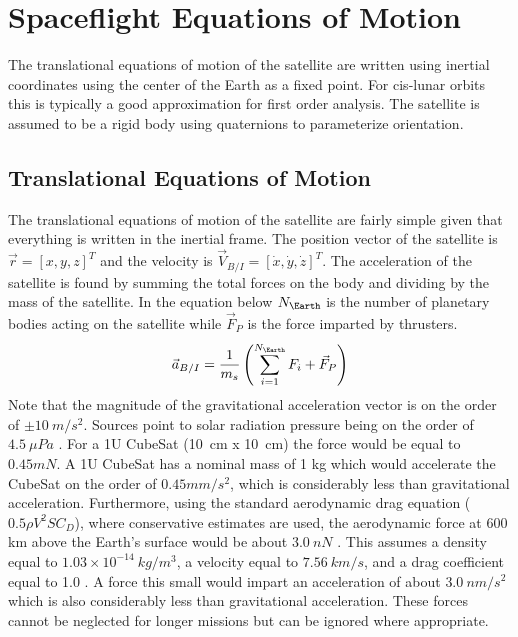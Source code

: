 \documentclass{article}
\begin{document}
\section{Spaceflight Equations of Motion}

The translational equations of motion of
the satellite are written using inertial coordinates using the center
of the Earth as a fixed point. For cis-lunar orbits this is typically
a good approximation for first order analysis. The satellite is
assumed to be a rigid body using quaternions to parameterize
orientation. 

\subsection{Translational Equations of Motion}

The translational equations of motion of the satellite are fairly simple given
that everything is written in the inertial frame. The position vector
of the satellite is $\vec{r} = [x,y,z]^T$ and the velocity is
$\vec{V}_{B/I}=[\dot{x},\dot{y},\dot{z}]^T$. The acceleration of
the satellite is found by summing the total forces on the body
and dividing by the mass of the satellite. In the equation below
$N_\Earth$ is the number of planetary bodies acting on the satellite
while $\vec{F}_P$ is the force imparted by thrusters. 
\begin{equation}
  \vec{a}_{B/I} = \frac{1}{m_s}\left(\sum\limits_{i=1}^{N_\Earth}F_i + \vec{F}_P \right)
\end{equation}
Note that the magnitude of the gravitational acceleration vector is on
the order of $\pm 10~m/s^2$. Sources point to solar radiation pressure
being on the order of $4.5~\mu Pa$ \cite{Radiation}. For a 1U CubeSat (10~cm x 10~cm)
the force would be equal to $0.45 mN$. A 1U CubeSat has a nominal
mass of 1 kg which would accelerate the CubeSat on the order of
$0.45 mm/s^2$, which is considerably less than gravitational
acceleration. Furthermore, using the standard aerodynamic drag
equation ($0.5\rho V^2 S C_D$), where conservative estimates are used,
the aerodynamic force at 600 km above the Earth's surface would be
about $3.0~nN$ \cite{AndersonD}. This assumes a density equal to $1.03
\times 10^{-14}~kg/m^3$, a velocity equal to $7.56~km/s$,
and a drag coefficient equal to 1.0 \cite{Density_Model}. A force this
small would impart an acceleration of about $3.0~nm/s^2$ which is also
considerably less than gravitational acceleration. These forces cannot be
neglected for longer missions but can be ignored where appropriate.
\end{document}
